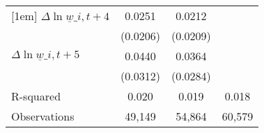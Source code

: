 {\begin{tabular}{l*{3}{c}}
[1em]
$\Delta \ln \underline{w}\_{i,t+4}$&   0.0251         &   0.0212         &                  \\
          & (0.0206)         & (0.0209)         &                  \\
[1em]
$\Delta \ln \underline{w}\_{i,t+5}$&   0.0440         &   0.0364         &                  \\
          & (0.0312)         & (0.0284)         &                  \\
\hline
R-squared &    0.020         &    0.019         &    0.018         \\
Observations&   49,149         &   54,864         &   60,579         \\
\hline\hline
\end{tabular}
}
